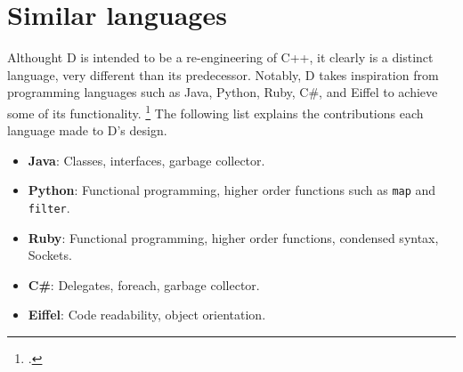 \section{Similar languages} \label{sec:similar_languages}

Althought D is intended to be a re-engineering of C++, it clearly is a distinct language, very different than its predecessor. Notably, D takes inspiration from programming languages such as Java, Python, Ruby, C\#, and Eiffel to achieve some of its functionality. \footcite{wikipedia_page} The following list explains the contributions each language made to D's design.

\begin{itemize}
  \item \textbf{Java}: Classes, interfaces, garbage collector.
  \item \textbf{Python}: Functional programming, higher order functions such as \texttt{map} and \texttt{filter}.
  \item \textbf{Ruby}: Functional programming, higher order functions, condensed syntax, Sockets.
  \item \textbf{C\#}: Delegates, foreach, garbage collector.
  \item \textbf{Eiffel}: Code readability, object orientation.
\end{itemize}
